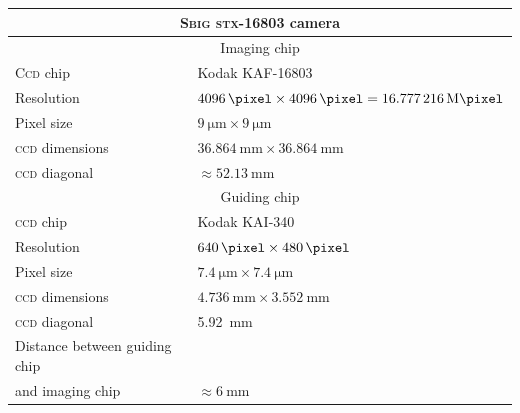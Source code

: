 \documentclass[a4paper, 11pt, fleqn]{memoir}
\begin{document}
\begin{table}[h!]
    \centering
    \begin{tabular}{ll}
        \toprule
        \multicolumn{2}{c}{\textbf{\textsc{Sbig stx-16803} camera}}                                                    \\
        \midrule
        \multicolumn{2}{c}{Imaging chip}                                                                               \\
        \midrule
        \textsc{Ccd} chip                 & Kodak KAF-16803                                                            \\
        Resolution                        & $\SI{4096}{\pixel} \times \SI{4096}{\pixel} = \SI{16.777216}{\mega\pixel}$ \\
        Pixel size                        & $\SI{9}{\um} \times \SI{9}{\um}$                                           \\
        \textsc{ccd} dimensions           & $\SI{36.864}{\mm} \times \SI{36.864}{\mm}$                                 \\
        \textsc{ccd} diagonal             & $\approx \SI{52.13}{\mm}$                                                  \\
        \midrule
        \multicolumn{2}{c}{Guiding chip}                                                                               \\
        \midrule
        \textsc{ccd} chip                 & Kodak KAI-340                                                              \\
        Resolution                        & $\SI{640}{\pixel} \times \SI{480}{\pixel}$                                 \\
        Pixel size                        & $\SI{7.4}{\um} \times \SI{7.4}{\um}$                                       \\
        \textsc{ccd} dimensions           & $\SI{4.736}{\mm} \times \SI{3.552}{\mm}$                                   \\
        \textsc{ccd} diagonal             & \SI{5.92}{\mm}                                                             \\
        Distance between guiding chip     &                                                                            \\
        and imaging chip                  & $\approx \SI{6}{\mm}$                                                      \\

\end{tabular}
\end{table}
\end{document}
